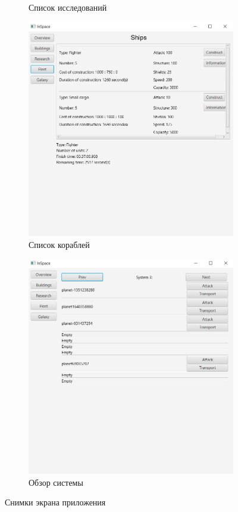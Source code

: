 \begin{figure}[H]
\begin{subfigure}[b]{0.4\textwidth}
\caption{Список исследований}
\end{subfigure}
\begin{subfigure}[b]{0.4\textwidth} 
\includegraphics[width=1\textwidth]{../screenshots/4.png}
\caption{Список кораблей}
\end{subfigure}
\begin{subfigure}[b]{0.4\textwidth} 
\includegraphics[width=1\textwidth]{../screenshots/5.png}
\caption{Обзор системы}
\end{subfigure}
\caption{Снимки экрана приложения}
\label{pic:gui}
\end{figure} 

